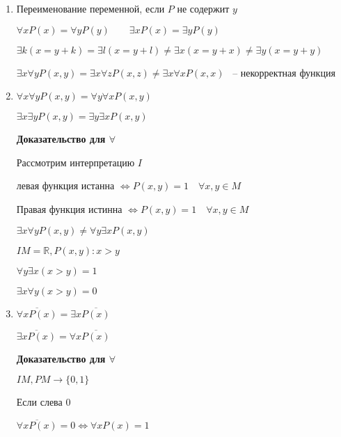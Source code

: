 \documentclass[russian]{lecture-notes}
\begin{document}
    \begin{enumerate}

        \item{
            Переименование переменной, если $P$ не содержит $y$

            $\forall x P(x) = \forall y P(y) \qquad \exists x P(x) = \exists y P(y)$

            $\exists k (x = y + k) = \exists l (x = y + l) \neq \exists x (x = y + x) \neq \exists y (x = y + y)$

            $\exists x \forall y P(x, y) = \exists x \forall z P (x, z) \neq \exists x \forall x P(x, x)$ ~-- некорректная функция
        }

        \item{
            $\forall x \forall y P(x, y) = \forall y \forall x P(x, y)$

            $\exists x \exists y P(x, y) = \exists y \exists x P(x, y)$


            \textbf{Доказательство для $\forall$}

            Рассмотрим интерпретацию $I$

            левая функция истанна $\Leftrightarrow P(x, y) = 1 \quad \forall x, y \in M$

            Правая функция истинна $\Leftrightarrow P(x, y) = 1 \quad \forall x, y \in M$

            \begin{remark}
                $\exists x \forall y P(x, y) \neq \forall y \exists x P(x, y)$

                $I M = \mathbb{R}, P(x, y): x > y$

                $\forall y \exists x (x > y) = 1$

                $\exists x \forall y (x > y) = 0$
            \end{remark}
        }

        \item{
            $\overline{\forall x P(x)} = \exists x \overline{P(x)}$

            $\overline{\exists x P(x)} = \forall x \overline{P(x)}$

            \textbf{Доказательство для $\forall$}

            $I M, P M \rightarrow \{ 0, 1\}$

            Если слева 0

            $\overline{\forall x P(x)} = 0 \Leftrightarrow \forall x P(x) = 1$

}
\end{enumerate}
\end{document}
